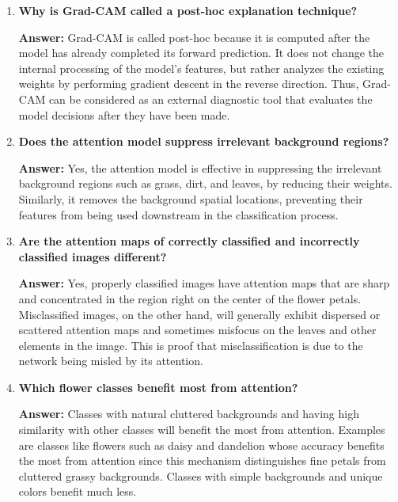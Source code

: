 \documentclass[10pt]{article}
\begin{document}
\begin{enumerate}
\vspace{5mm}

\item \textbf{Why is Grad-CAM called a post-hoc explanation technique?}

\textbf{Answer:} Grad-CAM is called post-hoc because it is computed after the model has already completed its forward prediction. It does not change the internal processing of the model’s features, but rather analyzes the existing weights by performing gradient descent in the reverse direction. Thus, Grad-CAM can be considered as an external diagnostic tool that evaluates the model decisions after they have been made.

\vspace{5mm}

\item \textbf{Does the attention model suppress irrelevant background regions?}

\textbf{Answer:} Yes, the attention model is effective in suppressing the irrelevant background regions such as grass, dirt, and leaves, by reducing their weights. Similarly, it removes the background spatial locations, preventing their features from being used downstream in the classification process.

\vspace{5mm}

\item \textbf{Are the attention maps of correctly classified and incorrectly
classified images different?}

\textbf{Answer:} Yes, properly classified images have attention maps that are sharp and concentrated in the region right on the center of the flower petals. Misclassified images, on the other hand, will generally exhibit dispersed or scattered attention maps and sometimes misfocus on the leaves and other elements in the image. This is proof that misclassification is due to the network being misled by its attention.

\vspace{5mm}

\item \textbf{Which flower classes benefit most from attention?}

\textbf{Answer:}  Classes with natural cluttered backgrounds and having high similarity with other classes will benefit the most from attention. Examples are classes like flowers such as daisy and dandelion whose accuracy benefits the most from attention since this mechanism distinguishes fine petals from cluttered grassy backgrounds. Classes with simple backgrounds and unique colors benefit much less.


\end{enumerate}
\end{document}
